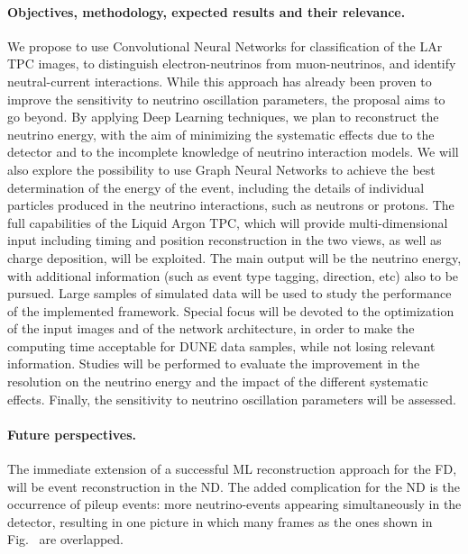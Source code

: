 \paragraph{Objectives, methodology, expected results and their relevance.} We propose to use Convolutional Neural Networks for classification of the LAr TPC images, to distinguish electron-neutrinos from muon-neutrinos, and identify neutral-current interactions.  While this approach has already been proven to improve the sensitivity to neutrino oscillation parameters, the proposal aims to go beyond. By applying Deep Learning techniques, we plan to reconstruct the neutrino energy, with the aim of minimizing the systematic effects due to the detector and to the incomplete knowledge of neutrino interaction models. We will also explore the possibility to use Graph Neural Networks to achieve the best determination of the energy of the event, including the details of  individual particles produced in the neutrino interactions, such as neutrons or protons. The full capabilities of the Liquid Argon TPC, which will provide multi-dimensional input including timing and position reconstruction in the two views, as well as charge deposition, will be exploited. The main output will be the neutrino energy, with  additional information (such as event type tagging, direction, etc) also to be pursued. Large samples of simulated data will be used to study the performance of the implemented framework. Special focus will be devoted to the optimization of the input images and of the network architecture, in order to make the computing time acceptable for DUNE data samples, while not losing relevant information. Studies will be performed to evaluate the improvement in the resolution on the neutrino energy and the impact of the different systematic effects. Finally, the sensitivity to neutrino oscillation parameters will be assessed. 
\vspace{-0.5cm}
\paragraph{Future perspectives.} The immediate extension of a successful ML reconstruction approach for the FD, will be event reconstruction in the ND. The added complication for the ND is the occurrence of pileup events: more neutrino-events appearing simultaneously in the detector, resulting in one picture in which many frames as the ones shown in Fig.~ are overlapped. 
\vspace{-0.5cm}
